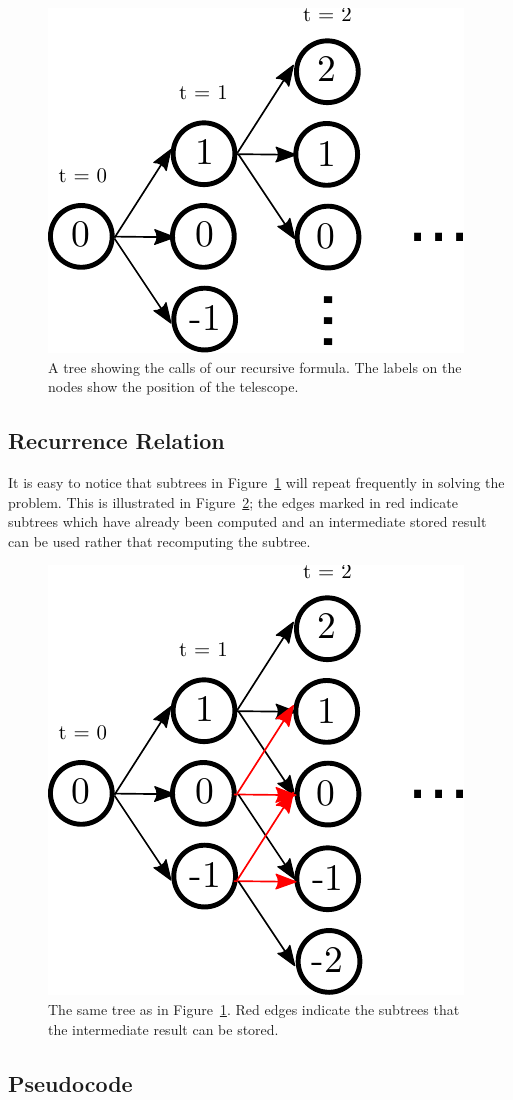 \documentclass[titlepage,12pt]{article}
\begin{document}
\begin{figure}[H]
    \begin{center}
    \includegraphics[width=0.4\linewidth]{dp_recursive}
    \end{center}
    \caption{A tree showing the calls of our recursive formula. The
    labels on the nodes show the position of the telescope.}
    \label{fig:recursive}
\end{figure}

\subsection{Recurrence Relation}

It is easy to notice that subtrees in Figure~\ref{fig:recursive} will repeat
frequently in solving the problem. This is illustrated in Figure~\ref{fig:red};
the edges marked in red indicate subtrees which have already been computed and
an intermediate stored result can be used rather that recomputing the subtree.

\begin{figure}[H]
    \begin{center}
    \includegraphics[width=0.4\linewidth]{dp_red}
    \end{center}
    \caption{The same tree as in Figure~\ref{fig:recursive}. Red edges indicate the
    subtrees that the intermediate result can be stored.}
    \label{fig:red}
\end{figure}

\subsection{Pseudocode}
\end{document}
